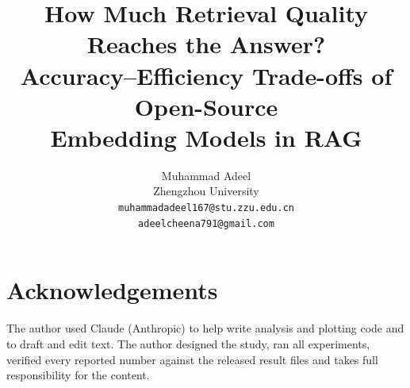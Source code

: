 \documentclass[11pt]{article}
\title{How Much Retrieval Quality Reaches the Answer?\\
Accuracy--Efficiency Trade-offs of Open-Source\\
Embedding Models in RAG}
\author{Muhammad Adeel \\
  Zhengzhou University \\
  \texttt{muhammadadeel167@stu.zzu.edu.cn} \\
  \texttt{adeelcheena791@gmail.com}}
\begin{document}
\maketitle












\ifdefined\authorversion
\section*{Acknowledgements}
The author used Claude (Anthropic) to help write analysis and plotting code and to draft and edit text.
The author designed the study, ran all experiments, verified every reported number against the released result files and takes full responsibility for the content.
\fi




\end{document}
